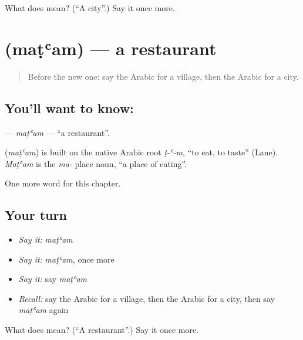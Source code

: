 \begin{tcolorbox}[breakable,colback=teal!4,colframe=teal!35!black,title={Before you move on}]
What does  mean? (\textquotedblleft{}A city\textquotedblright{}.) Say it once more.
\end{tcolorbox}
\section[\texorpdfstring{\ar{مطعم} (maṭʿam)}{مطعم (maṭʿam)}]{ (maṭʿam) — a restaurant}

\label{lesson:AR-C93-matam}



\begin{quote}
Before the new one: say the Arabic for a village, then the Arabic for a city.
\end{quote}

\subsection*{You'll want to know: }
\textbf{} — \emph{maṭʿam} — \textquotedblleft{}a restaurant\textquotedblright{}.

\begin{cousinweb}
\textbf{} (\emph{maṭʿam}) is built on the native Arabic root \emph{ṭ-ʿ-m}, \textquotedblleft{}to eat, to taste\textquotedblright{} (Lane). \emph{Maṭʿam} is the \emph{ma-} place noun, \textquotedblleft{}a place of eating\textquotedblright{}.
\end{cousinweb}

\begin{grammarlens}[title={What you've built}]
One more word for this chapter.
\end{grammarlens}

\subsection*{Your turn}
\begin{itemize}
\raggedright
  \item \emph{Say it:} \emph{maṭʿam}
  \item \emph{Say it:} \emph{maṭʿam}, once more
  \item \emph{Say it:} say \emph{maṭʿam}
  \item \emph{Recall:} say the Arabic for a village, then the Arabic for a city, then say \emph{maṭʿam} again
\end{itemize}

\begin{tcolorbox}[breakable,colback=teal!4,colframe=teal!35!black,title={Before you move on}]
What does  mean? (\textquotedblleft{}A restaurant\textquotedblright{}.) Say it once more.
\end{tcolorbox}
